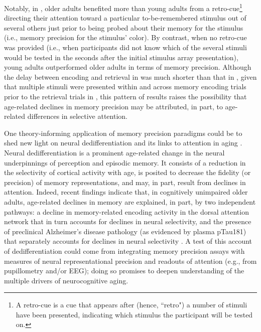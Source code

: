 Notably, in \textcite{souza2024older}, older adults benefited more than young adults from a retro-cue\footnote{A retro-cue is a cue that appears after (hence, ``retro") a number of stimuli have been presented, indicating which stimulus the participant will be tested on.} directing their attention toward a particular to-be-remembered stimulus out of several others just prior to being probed about their memory for the stimulus (i.e., memory precision for the stimulus’ color). By contrast, when no retro-cue was provided (i.e., when participants did not know which of the several stimuli would be tested in the seconds after the initial stimulus array presentation), young adults outperformed older adults in terms of memory precision. Although the delay between encoding and retrieval in \textcite{souza2024older} was much shorter than that in \textcite{korkki2023reduced}, given that multiple stimuli were presented within and across memory encoding trials prior to the retrieval trials in \textcite{korkki2023reduced}, this pattern of results raises the possibility that age-related declines in memory precision may be attributed, in part, to age-related differences in selective attention.

One theory-informing application of memory precision paradigms could be to shed new light on neural dedifferentiation and its links to attention in aging \parencite[e.g.,][]{koen2020age,park2013dynamic}. Neural dedifferentiation is a prominent age-related change in the neural underpinnings of perception and episodic memory. It consists of a reduction in the selectivity of cortical activity with age, is posited to decrease the fidelity (or precision) of memory representations, and may, in part, result from declines in attention. Indeed, recent findings indicate that, in cognitively unimpaired older adults, age-related declines in memory are explained, in part, by two independent pathways: a decline in memory-related encoding activity in the dorsal attention network that in turn accounts for declines in neural selectivity, and the presence of preclinical Alzheimer’s disease pathology (as evidenced by plasma pTau181) that separately accounts for declines in neural selectivity \parencite{sheng2024top}. A test of this account of dedifferentiation could come from integrating memory precision assays with measures of neural representational precision and readouts of attention (e.g., from pupillometry and/or EEG); doing so promises to deepen understanding of the multiple drivers of neurocognitive aging.


